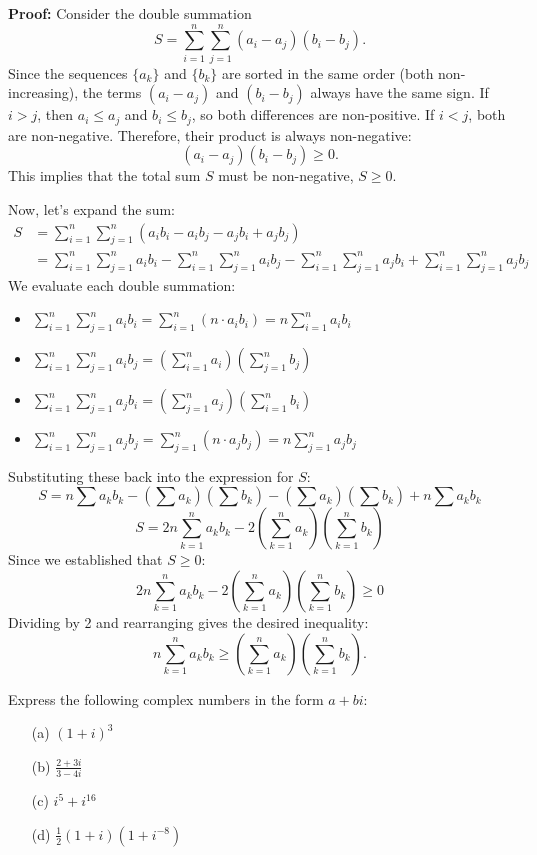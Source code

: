     \textbf{Proof:}
    Consider the double summation
    \[ S = \sum_{i=1}^n \sum_{j=1}^n (a_i - a_j)(b_i - b_j). \]
    Since the sequences $\{a_k\}$ and $\{b_k\}$ are sorted in the same order (both non-increasing), the terms $(a_i - a_j)$ and $(b_i - b_j)$ always have the same sign. If $i>j$, then $a_i \le a_j$ and $b_i \le b_j$, so both differences are non-positive. If $i<j$, both are non-negative. Therefore, their product is always non-negative:
    \[ (a_i - a_j)(b_i - b_j) \geq 0. \]
    This implies that the total sum $S$ must be non-negative, $S \geq 0$.
    
    Now, let's expand the sum:
    \begin{align*}
    S &= \sum_{i=1}^n \sum_{j=1}^n (a_i b_i - a_i b_j - a_j b_i + a_j b_j) \\
    &= \sum_{i=1}^n \sum_{j=1}^n a_i b_i - \sum_{i=1}^n \sum_{j=1}^n a_i b_j - \sum_{i=1}^n \sum_{j=1}^n a_j b_i + \sum_{i=1}^n \sum_{j=1}^n a_j b_j
    \end{align*}
    We evaluate each double summation:
    \begin{itemize}
        \item \( \sum_{i=1}^n \sum_{j=1}^n a_i b_i = \sum_{i=1}^n \left( n \cdot a_i b_i \right) = n \sum_{i=1}^n a_i b_i \)
        \item \( \sum_{i=1}^n \sum_{j=1}^n a_i b_j = \left( \sum_{i=1}^n a_i \right) \left( \sum_{j=1}^n b_j \right) \)
        \item \( \sum_{i=1}^n \sum_{j=1}^n a_j b_i = \left( \sum_{j=1}^n a_j \right) \left( \sum_{i=1}^n b_i \right) \)
        \item \( \sum_{i=1}^n \sum_{j=1}^n a_j b_j = \sum_{j=1}^n \left( n \cdot a_j b_j \right) = n \sum_{j=1}^n a_j b_j \)
    \end{itemize}
    Substituting these back into the expression for $S$:
    \[
    S = n \sum a_k b_k - \left(\sum a_k\right)\left(\sum b_k\right) - \left(\sum a_k\right)\left(\sum b_k\right) + n \sum a_k b_k
    \]
    \[
    S = 2n \sum_{k=1}^n a_k b_k - 2 \left( \sum_{k=1}^n a_k \right) \left( \sum_{k=1}^n b_k \right)
    \]
    Since we established that $S \geq 0$:
    \[
    2n \sum_{k=1}^n a_k b_k - 2 \left( \sum_{k=1}^n a_k \right) \left( \sum_{k=1}^n b_k \right) \geq 0
    \]
    Dividing by 2 and rearranging gives the desired inequality:
    \[
    n \sum_{k=1}^n a_k b_k \geq \left( \sum_{k=1}^n a_k \right) \left( \sum_{k=1}^n b_k \right).
    \]

\begin{problembox}
Express the following complex numbers in the form \( a + bi \):

\begin{enumerate}
\item[(a)] \( (1 + i)^3 \)
\item[(b)] \( \frac{2 + 3i}{3 - 4i} \)
\item[(c)] \( i^5 + i^{16} \)
\item[(d)] \( \frac{1}{2}(1 + i)(1 + i^{-8}) \)
\end{enumerate}
\end{problembox}

